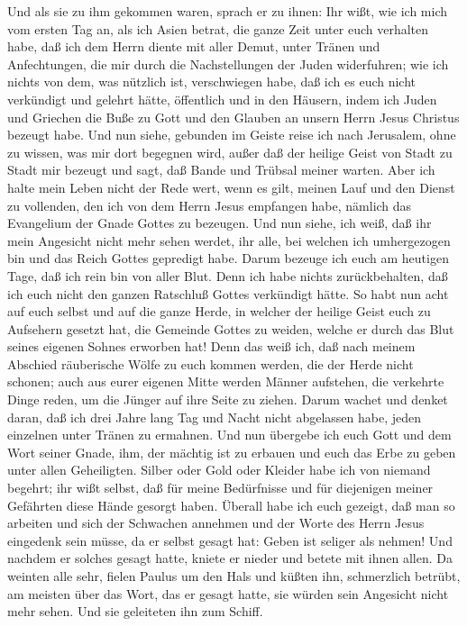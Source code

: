  Und als sie zu ihm gekommen waren, sprach er zu ihnen:
Ihr wißt, wie ich mich vom ersten Tag an, als ich Asien betrat, die
ganze Zeit unter euch verhalten habe,  daß ich dem Herrn
diente mit aller Demut, unter Tränen und Anfechtungen, die mir durch die
Nachstellungen der Juden widerfuhren;  wie ich nichts von
dem, was nützlich ist, verschwiegen habe, daß ich es euch nicht
verkündigt und gelehrt hätte, öffentlich und in den Häusern,
 indem ich Juden und Griechen die Buße zu Gott und den
Glauben an unsern Herrn Jesus Christus bezeugt habe.  Und
nun siehe, gebunden im Geiste reise ich nach Jerusalem, ohne zu wissen,
was mir dort begegnen wird,  außer daß der heilige Geist
von Stadt zu Stadt mir bezeugt und sagt, daß Bande und Trübsal meiner
warten.  Aber ich halte mein Leben nicht der Rede wert,
wenn es gilt, meinen Lauf und den Dienst zu vollenden, den ich von dem
Herrn Jesus empfangen habe, nämlich das Evangelium der Gnade Gottes zu
bezeugen.  Und nun siehe, ich weiß, daß ihr mein
Angesicht nicht mehr sehen werdet, ihr alle, bei welchen ich
umhergezogen bin und das Reich Gottes gepredigt habe. 
Darum bezeuge ich euch am heutigen Tage, daß ich rein bin von aller
Blut.  Denn ich habe nichts zurückbehalten, daß ich euch
nicht den ganzen Ratschluß Gottes verkündigt hätte.  So
habt nun acht auf euch selbst und auf die ganze Herde, in welcher der
heilige Geist euch zu Aufsehern gesetzt hat, die Gemeinde Gottes zu
weiden, welche er durch das Blut seines eigenen Sohnes erworben hat!
 Denn das weiß ich, daß nach meinem Abschied räuberische
Wölfe zu euch kommen werden, die der Herde nicht schonen;
 auch aus eurer eigenen Mitte werden Männer aufstehen,
die verkehrte Dinge reden, um die Jünger auf ihre Seite zu ziehen.
 Darum wachet und denket daran, daß ich drei Jahre lang
Tag und Nacht nicht abgelassen habe, jeden einzelnen unter Tränen zu
ermahnen.  Und nun übergebe ich euch Gott und dem Wort
seiner Gnade, ihm, der mächtig ist zu erbauen und euch das Erbe zu geben
unter allen Geheiligten.  Silber oder Gold oder Kleider
habe ich von niemand begehrt;  ihr wißt selbst, daß für
meine Bedürfnisse und für diejenigen meiner Gefährten diese Hände
gesorgt haben.  Überall habe ich euch gezeigt, daß man so
arbeiten und sich der Schwachen annehmen und der Worte des Herrn Jesus
eingedenk sein müsse, da er selbst gesagt hat: Geben ist seliger als
nehmen!  Und nachdem er solches gesagt hatte, kniete er
nieder und betete mit ihnen allen.  Da weinten alle sehr,
fielen Paulus um den Hals und küßten ihn,  schmerzlich
betrübt, am meisten über das Wort, das er gesagt hatte, sie würden sein
Angesicht nicht mehr sehen. Und sie geleiteten ihn zum Schiff.

